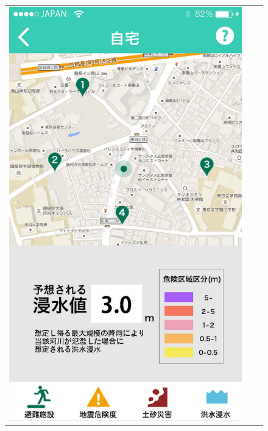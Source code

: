\documentclass[a4paper]{jsarticle}
\begin{document}
\begin{figure}[H]
\begin{center}
\begin{tabular}{ccc}
\begin{minipage}{0.3\hsize}
      \includegraphics[width=\hsize]{./images/mbs_flood.jpg}
    \end{minipage}
    &
    \begin{minipage}{0.3\hsize}

\end{minipage}
\end{tabular}
\end{center}
\end{figure}
\end{document}

